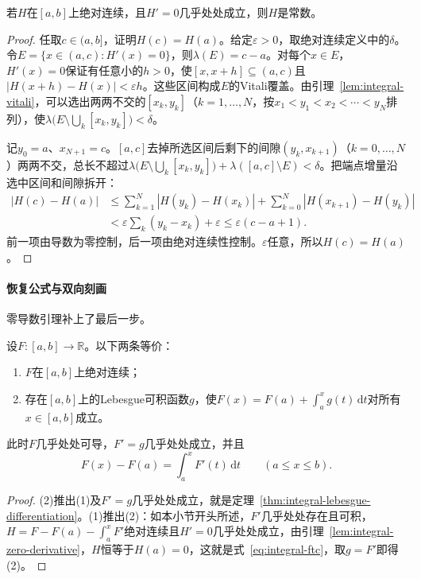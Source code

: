\begin{lemma}[零导数引理]
\label{lem:integral-zero-derivative}
若$H$在$[a,b]$上绝对连续，且$H'=0$几乎处处成立，则$H$是常数。
\end{lemma}

\begin{proof}
任取$c\in(a,b]$，证明$H(c)=H(a)$。给定$\varepsilon>0$，取绝对连续定义中的$\delta$。令$E=\{x\in(a,c):H'(x)=0\}$，则$\lambda(E)=c-a$。对每个$x\in E$，$H'(x)=0$保证有任意小的$h>0$，使$[x,x+h]\subseteq(a,c)$且$|H(x+h)-H(x)|<\varepsilon h$。这些区间构成$E$的Vitali覆盖。由引理~\ref{lem:integral-vitali}，可以选出两两不交的$[x_k,y_k]$（$k=1,\ldots,N$，按$x_1<y_1<x_2<\cdots<y_N$排列），使$\lambda\bigl(E\setminus\bigcup_k[x_k,y_k]\bigr)<\delta$。

记$y_0=a$、$x_{N+1}=c$。$[a,c]$去掉所选区间后剩下的间隙$(y_k,x_{k+1})$（$k=0,\ldots,N$）两两不交，总长不超过$\lambda\bigl(E\setminus\bigcup_k[x_k,y_k]\bigr)+\lambda([a,c]\setminus E)<\delta$。把端点增量沿选中区间和间隙拆开：
\[
 \begin{aligned}
 |H(c)-H(a)|&\le\sum_{k=1}^N|H(y_k)-H(x_k)|+\sum_{k=0}^N|H(x_{k+1})-H(y_k)|\\
 &<\varepsilon\sum_k(y_k-x_k)+\varepsilon\le\varepsilon(c-a+1).
 \end{aligned}
\]
前一项由导数为零控制，后一项由绝对连续性控制。$\varepsilon$任意，所以$H(c)=H(a)$。
\end{proof}

\paragraph{恢复公式与双向刻画}
零导数引理补上了最后一步。

\begin{theorem}[Lebesgue微积分基本定理]
\label{thm:integral-ftc}
设$F:[a,b]\to\mathbb R$。以下两条等价：
\begin{enumerate}
 \item $F$在$[a,b]$上绝对连续；
 \item 存在$[a,b]$上的Lebesgue可积函数$g$，使$F(x)=F(a)+\int_a^xg(t)\,\mathrm dt$对所有$x\in[a,b]$成立。
\end{enumerate}
此时$F$几乎处处可导，$F'=g$几乎处处成立，并且
\begin{equation}
 F(x)-F(a)=\int_a^xF'(t)\,\mathrm dt\qquad(a\le x\le b).
 \label{eq:integral-ftc}
\end{equation}
\end{theorem}

\begin{proof}
(2)推出(1)及$F'=g$几乎处处成立，就是定理~\ref{thm:integral-lebesgue-differentiation}。(1)推出(2)：如本小节开头所述，$F'$几乎处处存在且可积，$H=F-F(a)-\int_a^xF'$绝对连续且$H'=0$几乎处处成立，由引理~\ref{lem:integral-zero-derivative}，$H$恒等于$H(a)=0$，这就是式~\eqref{eq:integral-ftc}，取$g=F'$即得(2)。
\end{proof}

